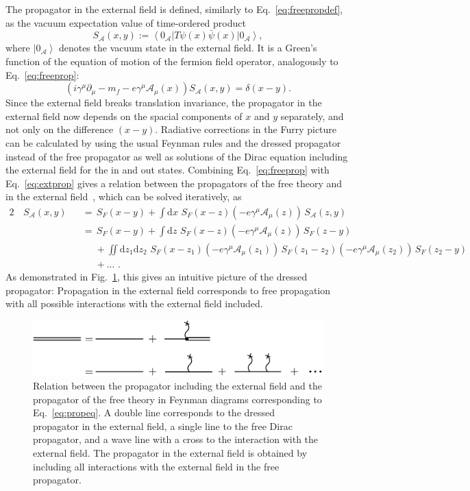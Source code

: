 The propagator in the external field is defined, similarly to Eq.~\eqref{eq:freepropdef}, as the vacuum expectation value of time-ordered product
\begin{equation}
S_{\mathcal{A}}(x,y):=\left<0_\mathcal{A}\right|T\psi(x)\bar{\psi}(x) \left|0_\mathcal{A}\right>,
\label{eq:extpropdef}
\end{equation}
where $\left|0_\mathcal{A}\right>$ denotes the vacuum state in the external field.
It is a Green's function of the equation of motion of the fermion field operator, analogously to Eq.~\eqref{eq:freeprop}:
\begin{equation}
\left(i\gamma^\mu \partial_\mu -m_f - e \gamma^\mu \mathcal{A}_\mu(x)\right)S_{\mathcal{A}}(x,y)=\delta(x-y).
\label{eq:extprop}
\end{equation}
Since the external field breaks translation invariance, the propagator in the external field now depends on the spacial components of $x$ and $y$ separately, and not only on the difference $(x-y)$. Radiative corrections in the Furry picture can be calculated by using the usual Feynman rules and the dressed propagator instead of the free propagator as well as solutions of the Dirac equation including the external field for the in and out states. Combining Eq.~\eqref{eq:freeprop} with Eq.~\eqref{eq:extprop} gives a relation between the propagators of the free theory and in the external field~\mbox{\cite[Section 2.5.]{itzykson2005}}, which can be solved iteratively, as
\begin{alignat}{2}
&\,S_{\mathcal{A}}(x,y)&&= \,S_F(x-y) 
+ \int\mathrm{d}x\, \,S_F(x-z)\left(-e\gamma^\mu \mathcal{A}_\mu(z)\right)\,S_{\mathcal{A}}(z,y)\\
& &&=\,S_F(x-y)+\int\mathrm{d}z\,\,S_F(x-z)(-e\gamma^\mu \mathcal{A}_\mu(z))\,S_F(z-y)\\
&&&\phantom{=}+\iint\mathrm{d}z_1\mathrm{d}z_2\,\,S_F(x-z_1)(-e\gamma^\mu \mathcal{A}_\mu(z_1))\,S_F(z_1-z_2)(-e\gamma^\mu \mathcal{A}_\mu(z_2))\,S_F(z_2-y)\\
&&&\phantom{=}+...\,\,.\label{eq:propeq}
\end{alignat}
As demonstrated in Fig.~\ref{fig:propagator}, this gives an intuitive picture of the dressed propagator: Propagation in the external field corresponds to free propagation with all possible interactions with the external field included.
%
\begin{figure}%
\centering
\includegraphics[width=0.9\linewidth]{pics/propagator.pdf}%
\caption{Relation between the propagator including the external field and the propagator of the free theory in Feynman diagrams corresponding to Eq.~\eqref{eq:propeq}. A double line corresponds to the dressed propagator in the external field, a single line to the free Dirac propagator, and a wave line with a cross to the interaction with the external field. The propagator in the external field is obtained by including all interactions with the external field in the free propagator.}%
\label{fig:propagator}%
\end{figure}
